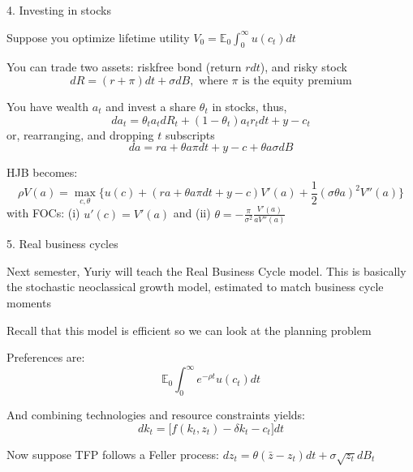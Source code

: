 \documentclass[11pt, aspectratio=169]{beamer}
\newenvironment{witemize}{\itemize\addtolength{\itemsep}{10pt}}{\enditemize}
\begin{document}
\begin{frame}{4. Investing in stocks}

{\small
\begin{witemize}
\item Suppose you optimize lifetime utility $V_0 = \mathbb{E}_0 \int_0^\infty u(c_t) dt$

\item You can trade two assets: riskfree bond (return $r dt$), and risky stock 
\begin{equation*}
	dR = (r + \pi) dt + \sigma dB, \text{ where } \pi \text{ is the equity premium}
\end{equation*}

\item You have wealth $a_t$ and invest a share $\theta_t$ in stocks, thus,
\begin{equation*}
	da_t = \theta_t a_t dR_t + (1-\theta_t) a_t r_t dt + y - c_t
\end{equation*}
or, rearranging, and dropping $t$ subscripts
\begin{equation*}
	da = r a + \theta a \pi dt + y - c + \theta a \sigma dB 
\end{equation*}

\item HJB becomes:
\begin{equation*}
	\rho V(a) = \max_{c, \theta} \Big\{ u(c) + (  r a + \theta a \pi dt + y - c  ) V'(a) + \frac{1}{2} (\sigma \theta a)^2 V''(a) \Big\}
\end{equation*}
with FOCs: (i) $u'(c) = V'(a)$ and (ii) $\theta = -\frac{\pi}{\sigma^2} \frac{ V'(a) }{a V''(a)}$
\end{witemize}
}
\end{frame}


\begin{frame}{5. Real business cycles}
\begin{witemize}
\item Next semester, Yuriy will teach the Real Business Cycle model. This is basically the stochastic neoclassical growth model, estimated to match business cycle moments 

\item Recall that this model is efficient so we can look at the planning problem

\item Preferences are:
\begin{equation*}
	\mathbb E_0 \int_0^\infty e^{- \rho t} u(c_t) dt
\end{equation*}

\item And combining technologies and resource constraints yields:
\begin{equation*}
	dk_t = \Big[ f(k_t, z_t) - \delta k_t - c_t \Big] dt
\end{equation*}

\item Now suppose TFP follows a Feller process: $dz_t = \theta(\bar z - z_t) dt + \sigma \sqrt{z_t} dB_t$
\end{witemize}
\end{frame}
\end{document}
